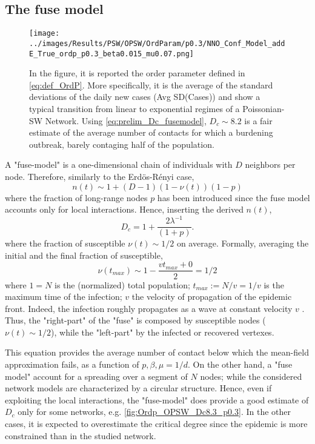 \documentclass[a4paper,10pt,twoside]{book} %
\theoremstyle{definition}
\begin{document}
\subsection*{The fuse model}
\label{sec:simple_D_c_fuse_model}
\begin{figure}[t]
	\texttt{[image: ../images/Results/PSW/OPSW/OrdParam/p0.3/NNO\_Conf\_Model\_addE\_True\_ordp\_p0.3\_beta0.015\_mu0.07.png]}
	\centering
	\caption{In the figure, it is reported the order parameter defined in \autoref{eq:def_OrdP}. More specifically, it is the average of the standard deviations of the daily new cases (Avg SD(Cases)) and show a typical transition from linear to exponential regimes of a Poissonian-SW Network. Using \autoref{eq:prelim_Dc_fusemodel}, $D_c \sim 8.2$ is a fair estimate of the average number of contacts for which a burdening outbreak, barely contaging half of the population.}
	\label{fig:SD_Threshold_Fuse_Model}
\end{figure}
A "fuse-model" is a one-dimensional chain of individuals with $D$ neighbors per node.
Therefore, similarly to the Erdös-Rényi case, 
\begin{equation}
	n(t) \sim 1+ (D-1)(1-\nu(t))(1-p)
	\label{eq:n(t)_fusemodel}
\end{equation}
where the fraction of long-range nodes $ p$ has been introduced since the fuse model accounts only for local interactions. 
Hence, inserting the derived $ n(t)$,
\begin{equation}
	D_c = 1 + \frac{2 \lambda^{-1}}{(1+p)}.
	\label{eq:simple_Dc_fusemodel}
\end{equation} 
where the fraction of susceptible $ \nu(t) \sim 1/2$ on average.  
Formally, averaging the initial and the final fraction of susceptible, 
\begin{equation}
	\nu(t_{max}) \sim 1-\frac{vt_{max}+0}{2} = 1/2
\end{equation}
where $1 = N$ is the (normalized) total population; $ t_{max}:= N/v = 1/v$ is the maximum time of the infection; $v$ the velocity of propagation of the epidemic front.  
Indeed, the infection roughly propagates as a wave at constant velocity $v$ . Thus, the "right-part" of the "fuse" is composed by susceptible nodes ($\nu(t) \sim 1/2$), while the "left-part" by the infected or recovered vertexes.

This equation provides the average number of contact below which the mean-field approximation fails, as a function of $p,\beta,\mu = 1/d$. On the other hand, a "fuse model" account for a spreading over a segment of $N$ nodes; while the considered network models are characterized by a circular structure. Hence, even if exploiting the local interactions, the "fuse-model" does provide a good estimate of $ D_c$ only for some networks, e.g. \autoref{fig:Ordp_OPSW_Dc8.3_p0.3}. In the other cases, it is expected to overestimate the critical degree since the epidemic is more constrained than in the studied network.
\end{document}
